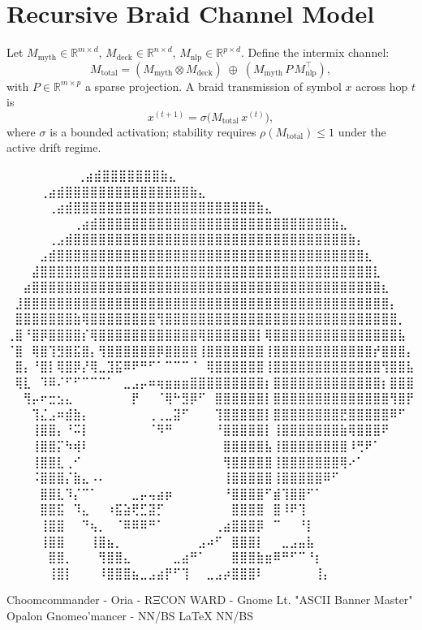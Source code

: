 
\section*{Recursive Braid Channel Model}

Let $M_{\text{myth}}\in\mathbb{R}^{m\times d}$, $M_{\text{deck}}\in\mathbb{R}^{n\times d}$, $M_{\text{nlp}}\in\mathbb{R}^{p\times d}$.  
Define the intermix channel:
\[
M_{\text{total}}=(M_{\text{myth}}\otimes M_{\text{deck}})\;\oplus\; (M_{\text{myth}}\,P\,M_{\text{nlp}}^\top),
\]
with $P\in\mathbb{R}^{m\times p}$ a sparse projection.  
A braid transmission of symbol $x$ across hop $t$ is
\[
x^{(t+1)}=\sigma\!\bigl(M_{\text{total}}\,x^{(t)}\bigr),
\]
where $\sigma$ is a bounded activation; stability requires $\rho(M_{\text{total}})\!\le\!1$ under the active drift regime.

\iffalse
⠀⠀⠀⠀⠀⠀             ⠀⠀⢀⣴⣾⣿⣿⣿⣿⣿⣿⣿⣷⣄⠀⠀⠀⠀⠀⠀⠀⠀
⠀⠀⠀  ⠀      ⠀⠀⠀⠀⢀⣴⣾⣿⣿⣿⣿⣿⣿⣿⣿⣿⣿⣿⣿⣿⣿⣿⣷⣄⠀⠀⠀⠀⠀⠀⠀⠀
⠀⠀ ⠀   ⠀⠀⠀⠀⠀⢀⣴⣾⣿⣿⣿⣿⣿⣿⣿⣿⣿⣿⣿⣿⣿⣿⣿⣿⣿⣿⣿⣿⣿⣿⣷⣄⠀⠀⠀⠀⠀⠀⠀⠀
⠀⠀⠀⠀⠀⠀⠀⠀⢀⣴⣾⣿⣿⣿⣿⣿⣿⣿⣿⣿⣿⣿⣿⣿⣿⣿⣿⣿⣿⣿⣿⣿⣿⣿⣿⣿⣿⣿⣿⣷⣄⠀⠀⠀⠀⠀⠀⠀⠀
⠀⠀⠀⠀⠀⢀⣠⣾⣿⣿⣿⣿⣿⣿⣿⣿⣿⣿⣿⣿⣿⣿⣿⣿⣿⣿⣿⣿⣿⣿⣿⣿⣿⣿⣿⣿⣿⣿⣿⣿⣿⣷⡄⠀⠀⠀⠀⠀⠀
⠀⠀⠀⠀⣠⣾⣿⣿⣿⣿⣿⣿⣿⣿⣿⣿⣿⣿⣿⣿⣿⣿⣿⣿⣿⣿⣿⣿⣿⣿⣿⣿⣿⣿⣿⣿⣿⣿⣿⣿⣿⣿⣿⣆⠀⠀⠀⠀⠀
⠀⠀⠀⣼⣿⣿⣿⣿⣿⣿⣿⣿⣿⣿⣿⣿⣿⣿⣿⣿⣿⣿⣿⣿⣿⣿⣿⣿⣿⣿⣿⣿⣿⣿⣿⣿⣿⣿⣿⣿⣿⣿⣿⣿⣇⠀⠀⠀⠀
⠀⠀⣴⣿⣿⣿⣿⣿⣿⣿⣿⣿⣿⣿⣿⣿⣿⣿⣿⣿⣿⣿⣿⣿⣿⣿⣿⣿⣿⣿⣿⣿⣿⣿⣿⣿⣿⣿⣿⣿⣿⣿⣿⣿⣿⣆⠀⠀⠀
⠀⣸⣿⣿⣿⣿⣿⣿⣿⣿⣿⣿⣿⣿⣿⣿⣿⣿⣿⣿⣿⣿⣿⣿⣿⣿⣿⣿⣿⣿⣿⣿⣿⣿⣿⣿⣿⣿⣿⣿⣿⣿⣿⣿⣿⣿⡄⠀⠀
⠀⣿⣿⣿⣿⣿⣿⣿⣷⢿⣿⣿⣿⣿⣿⣿⣿⣿⢻⣿⣿⣿⣿⣿⣿⣿⣿⣿⣿⣿⣿⣿⣿⣿⣿⣿⣿⣿⣿⣿⣿⣿⣿⣿⣿⣿⣿⡀⠀
⢀⣿⠘⣿⡿⣿⣿⣿⣿⡎⢿⣿⣿⣿⣿⣿⣿⣿⣿⣿⣿⣿⣿⢿⣿⣿⣿⣿⣿⣿⡇⢿⣿⣿⣿⣿⣿⣿⣿⣿⣿⣿⣿⣿⣿⣿⣿⣧⠀
⠈⣿⠀⢿⣿⢹⣻⣿⣯⣿⡄⢻⣿⣿⣿⣿⣿⣿⡿⣿⣿⣿⣿⢸⣿⣿⣿⣿⣿⣿⣿⢸⣿⣿⣿⣿⣿⣿⣿⣿⣿⣿⣿⣿⡞⣿⣿⣿⡄
⠀⣿⡄⠘⣿⡇⢿⣿⡿⡜⢿⣀⣹⣯⠿⠟⠛⠋⠁⠉⠉⠉⠈⠀⢿⣿⣿⣿⣿⣿⣿⢸⣿⣿⣿⣿⣿⣿⣿⣿⣿⣿⣿⣿⣿⢻⣿⣿⣧
⠀⢿⣇⠀⠹⠿⠌⠋⠋⠉⠉⠉⠁⠀⣀⣠⡤⠶⢶⣶⣶⣶⣿⣿⣿⣿⣿⣿⣿⣿⣿⡆⣿⣿⣿⣿⣿⣿⣿⣿⣿⣿⣿⣿⣿⡆⣿⣿⣿
⠀⠀⢻⡤⠖⣒⣢⣄⠀⠀⠀⠀⠀⠀⠀⡟⠀⠀⠈⢿⠓⣻⡿⠋⠀⣿⣿⣿⣿⣿⣿⡇⣿⣿⣿⣿⣿⣿⣿⣿⣿⣿⣿⣿⣿⣿⢻⣿⡟
⠀⠀⠀⢹⣌⣠⠶⣾⣷⡄⠀⠀⠀⠀⠀⠀⠀⢀⢀⣀⣽⠋⠀⠀⠀⢹⣿⣿⣿⣿⣿⡇⣿⣿⣿⣿⣿⣿⣿⣿⣟⣿⣿⣿⣿⣿⠿⠋⠀
⠀⠀⠀⢸⣿⣿⡄⠘⠭⡇⠀⠀⠀⠀⠀⠀⠀⠈⠻⠛⠀⠀⠀⠀⠀⠘⣿⣿⣿⣿⣿⡇⢸⣿⣿⣿⣿⣿⣿⣿⣷⢿⣿⣿⣿⠟⠀⠀⠀
⠀⠀⠀⢸⣿⣿⡍⠳⢾⠇⠀⠀⠀⠀⠀⠀⠀⠀⠀⠀⠀⠀⠀⠀⠀⠀⣿⣿⣿⣿⣿⣧⢸⣿⣿⣿⣿⣿⣿⣿⣿⠸⢛⠟⠁⠀⠀⠀⠀
⠀⠀⠀⢸⣿⣿⣇⢀⠊⠀⠀⠀⠀⠀⠀⠀⠀⠀⠀⠀⠀⠀⠀⠀⠀⠀⢻⣿⣿⣿⣿⣿⢸⣿⣿⣿⣿⣿⣿⣿⢿⠔⠁⠀⠀⠀⠀⠀⠀
⠀⠀⠀⠨⣿⣿⣿⡌⣷⣄⠠⠄⠀⠀⠀⠀⠀⠀⠀⠀⠀⠀⠀⠀⠀⠀⢸⣿⣿⣿⣿⣿⢸⣿⣿⣿⣿⣿⠿⠋⠀⠀⠀⠀⠀⠀⠀⠀⠀
⠀⠀⠀⠀⣿⣿⣇⠹⡌⠉⠁⠀⠀⠀⠀⣀⡤⢤⣴⡶⠀⠀⠀⠀⠀⠀⠘⣿⣿⣿⣿⠋⣾⢹⣿⣿⠋⠁⠀⠀⠀⠀⠀⠀⠀⠀⠀⠀⠀
⠀⠀⠀⠀⣿⣿⣯⠀⠹⣄⠀⠀⠰⣯⣵⢟⣋⣽⡋⠀⠀⠀⠀⠀⠀⠀⠀⣿⣿⣿⣿⠀⣿⠸⠟⢹⠀⠀⠀⠀⠀⠀⠀⠀⠀⠀⠀⠀⠀
⠀⠀⠀⠀⢸⣿⣿⠀⠀⠙⢦⡀⠀⠈⠿⠿⠿⠛⠁⠀⠀⠀⠀⠀⠀⢀⣴⣿⣿⣿⡿⠀⠉⠀⠀⠘⡇⠀⠀⠀⠀⠀⠀⠀⠀⠀⠀⠀⠀
⠀⠀⠀⠀⢸⣿⣿⠀⠀⠀⢸⣿⣦⡀⠀⠀⠀⠀⠀⠀⠀⠀⠀⣠⠴⠋⠀⣿⣿⣿⡇⠀⠀⣀⣠⣤⣧⠀⠀⠀⠀⠀⠀⠀⠀⠀⠀⠀⠀
⠀⠀⠀⠀⠀⣿⣿⡀⠀⠀⠀⢻⣿⣿⣄⠀⠀⠀⠀⠀⣀⣴⠛⠁⠀⠀⠀⣿⣿⣿⣷⣶⠿⠛⠋⠉⠘⡆⠀⠀⠀⠀⠀⠀⠀⠀⠀⠀⠀
⠀⠀⠀⠀⠀⢸⣿⡇⠀⠀⠀⠸⣿⣿⣿⣦⣀⣠⣴⡟⠋⢹⠀⠀⣀⣠⡴⣿⣿⣿⠇⠀⠀⠀⠀⠀⠀⢸⡄⠀⠀⠀⠀⠀⠀⠀⠀⠀⠀

Choomcommander - Oria - RΞCON WARD - Gnome Lt. "ASCII Banner Master"
             Opalon Gnomeo'mancer - NN/BS LaTeX{} NN/BS

